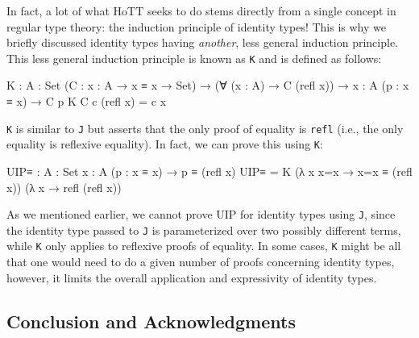 \documentclass[12pt]{article}
\begin{document}
In fact, a lot of what HoTT seeks to do stems directly from a single concept in
regular type theory: the induction principle of identity types! This is why we
briefly discussed identity types having {\em another}, less general induction
principle. This less general induction principle is known as {\tt K} and is
defined as follows:
\begin{center}
\begin{minipage}{0.9\textwidth}
\begin{code}
K : {A : Set} (C : {x : A} → x ≡ x → Set) →
    (∀ (x : A) → C (refl x)) →
    {x : A} (p : x ≡ x) → C p
K C c (refl x) = c x
\end{code}
\end{minipage}
\end{center}
{\tt K} is similar to {\tt J} but asserts that the only proof of equality is
{\tt refl} (i.e., the only equality is reflexive equality). In fact, we can
prove this using {\tt K}:
\begin{center}
\begin{minipage}{0.9\textwidth}
\begin{code}
UIP≡ : {A : Set} {x : A} (p : x ≡ x) → p ≡ (refl x)
UIP≡ = 
  K (λ {x} x=x → x=x ≡ (refl x))
    (λ x → refl (refl x))
\end{code}
\end{minipage}
\end{center}
As we mentioned earlier, we cannot prove UIP for identity types using {\tt J},
since the identity type passed to {\tt J} is parameterized over two possibly
different terms, while {\tt K} only applies to reflexive proofs of equality.
In some cases, {\tt K} might be all that one would need to do a given number
of proofs concerning identity types, however, it limits the overall application
and expressivity of identity types.
\subsection*{Conclusion and Acknowledgments}
\end{document}
